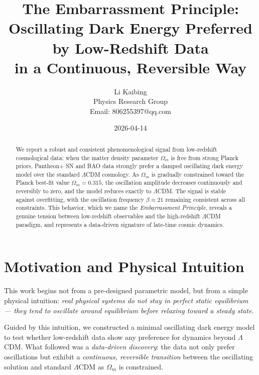 \documentclass[10pt,a4paper,twocolumn]{article}
\begin{document}
\title{The Embarrassment Principle:\\
Oscillating Dark Energy Preferred by Low-Redshift Data\\
in a Continuous, Reversible Way}
\author{Li Kaibing\\
Physics Research Group\\
Email: 806255397@qq.com}
\date{2026-04-14}
\maketitle

\begin{abstract}
We report a robust and consistent phenomenological signal from low-redshift cosmological data: when the matter density parameter $\Omega_m$ is free from strong Planck priors, Pantheon+ SN and BAO data strongly prefer a damped oscillating dark energy model over the standard $\Lambda$CDM cosmology. As $\Omega_m$ is gradually constrained toward the Planck best-fit value $\Omega_m = 0.315$, the oscillation amplitude decreases continuously and reversibly to zero, and the model reduces exactly to $\Lambda$CDM. The signal is stable against overfitting, with the oscillation frequency $\beta\approx21$ remaining consistent across all constraints. This behavior, which we name the \emph{Embarrassment Principle}, reveals a genuine tension between low-redshift observables and the high-redshift $\Lambda$CDM paradigm, and represents a data-driven signature of late-time cosmic dynamics.
\end{abstract}

\section{Motivation and Physical Intuition}
This work begins not from a pre-designed parametric model, but from a simple physical intuition:
\emph{real physical systems do not stay in perfect static equilibrium — they tend to oscillate around equilibrium before relaxing toward a steady state.}

Guided by this intuition, we constructed a minimal oscillating dark energy model to test whether low-redshift data show any preference for dynamics beyond $\Lambda$CDM.
What followed was a \emph{data-driven discovery}:
the data not only prefer oscillations but exhibit a \emph{continuous, reversible transition} between the oscillating solution and standard $\Lambda$CDM as $\Omega_m$ is constrained.
\end{document}

